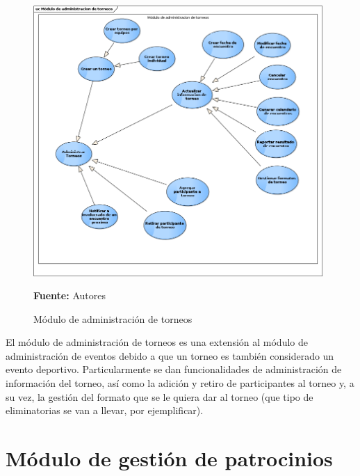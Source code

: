 \begin{figure}[!htb]
  \begin{center}
    \includegraphics[width=11cm]{./imagenes/casos_uso/gestion_torneo.png}
    \caption{Módulo de administración de torneos}
    \label{fig:cu_admin_torn}
    \textbf{Fuente:} Autores
  \end{center}
\end{figure}

El módulo de administración de torneos es una extensión al módulo de administración de eventos debido a que un torneo es también considerado un evento deportivo. Particularmente se dan funcionalidades de administración de información del torneo, así como la adición y retiro de participantes al torneo y, a su vez, la gestión del formato que se le quiera dar al torneo (que tipo de eliminatorias se van a llevar, por ejemplificar).

\section{Módulo de gestión de patrocinios}

